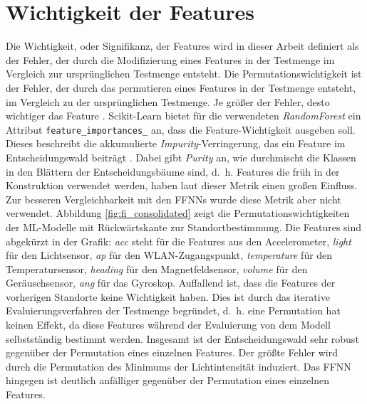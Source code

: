 \newpage
\section{Wichtigkeit der Features}
\label{sec:eval_feature_importance}
Die Wichtigkeit, oder Signifikanz, der Features wird in dieser Arbeit definiert als der Fehler,
der durch die Modifizierung eines Features in der Testmenge im Vergleich zur ursprünglichen Testmenge entsteht.
Die Permutationswichtigkeit ist der Fehler, der durch das permutieren eines Features in der Testmenge entsteht, im Vergleich zu der ursprünglichen Testmenge.
Je größer der Fehler, desto wichtiger das Feature \cite{breiman2001random}.
\newline
\newline
Scikit-Learn bietet für die verwendeten \textit{RandomForest} ein Attribut \texttt{feature\_importances\_} an, dass die Feature-Wichtigkeit ausgeben soll.
Dieses beschreibt die akkumulierte \textit{Impurity}-Verringerung, das ein Feature im Entscheidungswald beiträgt \cite{ScikitLearnFeatureImportance}.
Dabei gibt \textit{Purity} an, wie durchmischt die Klassen in den Blättern der Entscheidungsbäume sind,
d.~h. Features die früh in der Konstruktion verwendet werden, haben laut dieser Metrik einen großen Einfluss.
Zur besseren Vergleichbarkeit mit den FFNNs wurde diese Metrik aber nicht verwendet.
\newline
\newline
Abbildung \ref{fig:fi_consolidated} zeigt die Permutationswichtigkeiten der ML-Modelle mit Rückwärtskante zur Standortbestimmung.
Die Features sind abgekürzt in der Grafik: \textit{acc} steht für die Features aus den Accelerometer, \textit{light} für den Lichtsensor, \textit{ap} für den WLAN-Zugangspunkt,
\textit{temperature} für den Temperatursensor, \textit{heading} für den Magnetfeldsensor, \textit{volume} für den Geräuschsensor, \textit{ang} für das Gyroskop.
\newline
\newline
Auffallend ist, dass die Features der vorherigen Standorte keine Wichtigkeit haben.
Dies ist durch das iterative Evaluierungsverfahren der Testmenge begründet,
d.~h. eine Permutation hat keinen Effekt, da diese Features während der Evaluierung von dem Modell selbstständig bestimmt werden.
Insgesamt ist der Entscheidungswald sehr robust gegenüber der Permutation eines einzelnen Features.
Der größte Fehler wird durch die Permutation des Minimums der Lichtintensität induziert.
Das FFNN hingegen ist deutlich anfälliger gegenüber der Permutation eines einzelnen Features.
